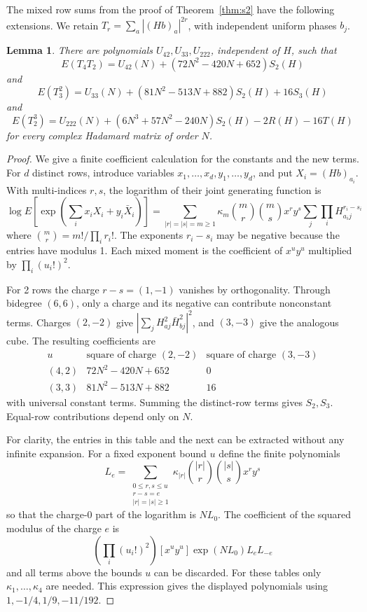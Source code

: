 \documentclass[11pt,a4paper]{article}
\newtheorem{lem}[thm]{Lemma}
\theoremstyle{remark}
\begin{document}
The mixed row sums from the proof of Theorem~\ref{thm:s2} have the following extensions. We retain $T_r=\sum_a|(Hb)_a|^{2r}$, with independent uniform phases $b_j$.

\begin{samepage}
\begin{lem}\label{lem:sixmixed}
There are polynomials $U_{42},U_{33},U_{222}$, independent of $H$, such that
\[
 E(T_4T_2)=U_{42}(N)+(72N^2-420N+652)S_2(H)
\]
and
\[
 E(T_3^2)=U_{33}(N)+(81N^2-513N+882)S_2(H)+16S_3(H)
\]
and
\[
 E(T_2^3)=U_{222}(N)+(6N^3+57N^2-240N)S_2(H)-2R(H)-16T(H)
\]
for every complex Hadamard matrix of order $N$.
\end{lem}
\end{samepage}
\begin{proof}
We give a finite coefficient calculation for the constants and the new terms. For $d$ distinct rows, introduce variables $x_1,\ldots,x_d,y_1,\ldots,y_d$, and put $X_i=(Hb)_{a_i}$. With multi-indices $r,s$, the logarithm of their joint generating function is
\[
 \log E\left[\exp\left(\sum_i x_iX_i+y_i\bar X_i\right)\right]
   =\sum_{|r|=|s|=m\ge1}
       \kappa_m\binom mr\binom ms x^ry^s
       \sum_j\prod_iH_{a_i j}^{r_i-s_i}
\]
where $\binom mr=m!/\prod_i r_i!$. The exponents $r_i-s_i$ may be negative because the entries have modulus 1. Each mixed moment is the coefficient of $x^uy^u$ multiplied by $\prod_i(u_i!)^2$.

For 2 rows the charge $r-s=(1,-1)$ vanishes by orthogonality. Through bidegree $(6,6)$, only a charge and its negative can contribute nonconstant terms. Charges $(2,-2)$ give $|\sum_jH_{aj}^2\bar H_{bj}^2|^2$, and $(3,-3)$ give the analogous cube. The resulting coefficients are
\[
\begin{array}{c|cc}
 u & \text{square of charge }(2,-2)&\text{square of charge }(3,-3)\\
 \hline
 (4,2)&72N^2-420N+652&0\\
 (3,3)&81N^2-513N+882&16
\end{array}
\]
with universal constant terms. Summing the distinct-row terms gives $S_2,S_3$. Equal-row contributions depend only on $N$.

For clarity, the entries in this table and the next can be extracted without any infinite expansion. For a fixed exponent bound $u$ define the finite polynomials
\[
 L_e=\sum_{\substack{0\le r,s\le u\\r-s=e\\|r|=|s|\ge1}}
           \kappa_{|r|}\binom{|r|}{r}\binom{|s|}{s}x^ry^s
\]
so that the charge-0 part of the logarithm is $NL_0$. The coefficient of the squared modulus of the charge $e$ is
\[
 \left(\prod_i(u_i!)^2\right)
 [x^uy^u]\exp(NL_0)L_eL_{-e}
\]
and all terms above the bounds $u$ can be discarded. For these tables only $\kappa_1,\ldots,\kappa_4$ are needed. This expression gives the displayed polynomials using $1,-1/4,1/9,-11/192$.


\end{proof}
\end{document}
